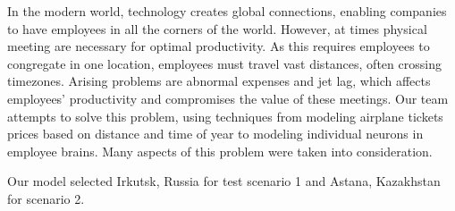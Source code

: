 In the modern world, technology creates global connections, enabling companies to have employees in all the corners of the world. However, at times physical meeting are necessary for optimal productivity. As this requires employees to congregate in one location, employees must travel vast distances, often crossing timezones. Arising problems are abnormal expenses and jet lag, which affects employees' productivity and compromises the value of these meetings. Our team attempts to solve this problem, using techniques from modeling airplane tickets prices based on distance and time of year to modeling individual neurons in employee brains. Many aspects of this problem were taken into consideration.


Our model selected Irkutsk, Russia for test scenario 1 and Astana, Kazakhstan for scenario 2.
